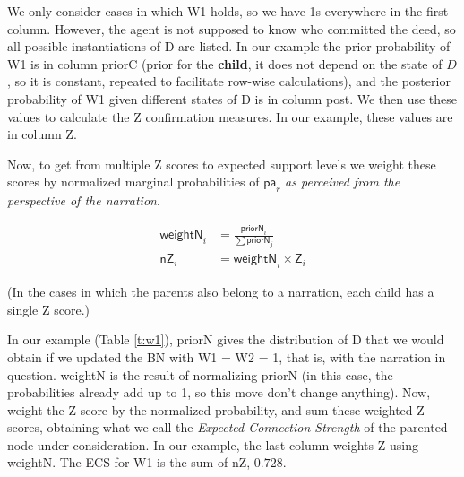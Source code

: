 \documentclass[10pt,]{scrartcl}
\newcommand{\s}[1]{\mbox{\textsf{#1}}}
\begin{document}
 We only consider cases in which \textsf{W1} holds, so we have 1s everywhere in the first column. However, the agent is not supposed to know who committed the deed, so all possible instantiations of \textsf{D} are listed.   In our example the prior probability of \s{W1} is in column \textsf{priorC} (prior for the \textbf{child}, it does not depend on the state of $D$, so it is constant, repeated to facilitate row-wise calculations), and the posterior probability of \textsf{W1} given different states of \textsf{D} is in column \s{post}.  We then  use these values to calculate the \s{Z} confirmation measures. In our example, these values are in column \s{Z}. 
 
 
 Now, to get from multiple \s{Z} scores to expected support levels we weight these scores by normalized  marginal probabilities of \(\mathsf{pa}_r\) \emph{as perceived from the perspective of the narration}. 
 
 \begin{align*}
    \mathsf{weightN}_i & = \frac{\mathsf{priorN}_i}{\sum \mathsf{priorN}_j}\\
    \mathsf{nZ}_{i} & = \mathsf{weightN}_i \times \mathsf{Z}_i
 \end{align*}
 
 
 \noindent (In  the cases in which the parents also belong to a narration,  each child has a single \s{Z} score.) 

 




 In our example (Table \ref{t:w1}), \textsf{priorN} gives the distribution of \textsf{D} that we would obtain if we updated the BN with \textsf{W1} = \textsf{W2} = 1, that is, with the narration in question.  \textsf{weightN} is the result of normalizing \textsf{priorN} (in this case, the probabilities already add up to 1, so this move don't change anything). Now, weight the Z score by the normalized probability, and sum these weighted Z scores, obtaining what we call the \emph{Expected Connection Strength} of the parented node under consideration.   In our example, the last column weights \textsf{Z} using  \textsf{weightN}. The \textsf{ECS} for \textsf{W1} is the sum of \textsf{nZ}, $0.728$.
\end{document}
